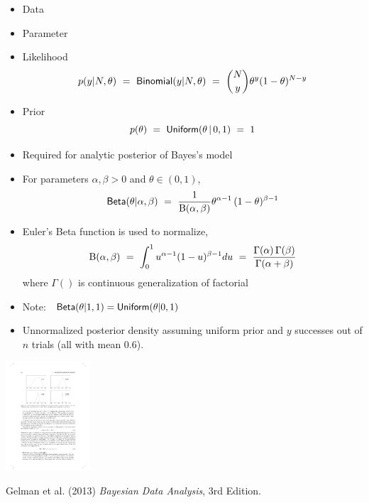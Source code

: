 \documentclass[10pt]{report}
\begin{document}
\begin{itemize}
\item{Data}
\item Parameter
\item Likelihood
\[
p(y|N,\theta) 
\ = \ \text{\sf Binomial}(y|N,\theta) 
\ = \ \binom{N}{y} \theta^{y} (1 - \theta)^{N-y}
\]
\item Prior
\[
p(\theta) 
\ = \ \text{\sf Uniform}(\theta \, | \, 0,1) 
\ = \ 1
\]
\end{itemize}

\begin{itemize}
\item Required for analytic posterior of Bayes's model
\item For parameters $\alpha,\beta > 0$ and $\theta \in (0,1)$,
\[
\text{\sf Beta}(\theta|\alpha,\beta) 
\ = \ \frac{1}{{\text B}(\alpha,\beta)} 
      \theta^{\alpha - 1} \, 
      (1 - \theta)^{\beta-1}
\] 
\item Euler's Beta function is used to normalize,
\[
{\text B}(\alpha,\beta) 
\ = \ \int_0^1 u^{\alpha-1}(1-u)^{\beta-1} du
\ = \ \frac{\Gamma(\alpha)\,\Gamma(\beta)}{\Gamma(\alpha + \beta)}
\]
where $\Gamma()$ is continuous generalization of factorial
\item Note: \ $\text{\sf Beta}(\theta|1,1) = \text{\sf Uniform}(\theta|0,1)$
\end{itemize}

\vspace*{-4pt}
\begin{itemize}
\item Unnormalized posterior density assuming uniform prior and $y$
  successes out of $n$ trials (all with mean 0.6).
\end{itemize}
\begin{center}
\includegraphics[height=1.6in]{img/bda-beta-plots.pdf}
\end{center}
\vspace*{-12pt}
\hfill {\tiny Gelman et al. (2013) {\slshape Bayesian Data Analysis},
  3rd Edition.}
\end{document}
